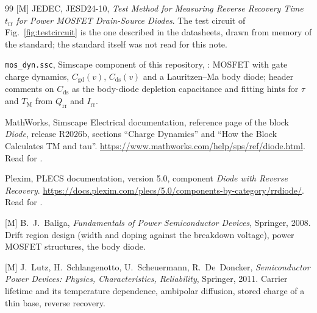\documentclass[10pt,a4paper]{scrartcl}
\begin{document}
\begin{thebibliography}{99}
[M] JEDEC, JESD24-10, \emph{Test Method for Measuring Reverse Recovery Time $t_\mathrm{rr}$ for Power MOSFET Drain-Source Diodes}. The test circuit of Fig.~\ref{fig:testcircuit} is the one described in the datasheets, drawn from memory of the standard; the standard itself was not read for this note.

\texttt{mos\_dyn.ssc}, Simscape component of this repository, : MOSFET with gate charge dynamics, $C_\mathrm{gd}(v)$, $C_\mathrm{ds}(v)$ and a Lauritzen--Ma body diode; header comments on $C_\mathrm{ds}$ as the body-diode depletion capacitance and fitting hints for $\tau$ and $T_\mathrm{M}$ from $Q_\mathrm{rr}$ and $I_\mathrm{rr}$.

MathWorks, Simscape Electrical documentation, reference page of the block \emph{Diode}, release R2026b, sections ``Charge Dynamics'' and ``How the Block Calculates TM and tau''. \url{https://www.mathworks.com/help/sps/ref/diode.html}. Read for \cite{lmnote}.

Plexim, PLECS documentation, version 5.0, component \emph{Diode with Reverse Recovery}. \url{https://docs.plexim.com/plecs/5.0/components-by-category/rrdiode/}. Read for \cite{lmnote}.

[M] B.~J.~Baliga, \emph{Fundamentals of Power Semiconductor Devices}, Springer, 2008. Drift region design (width and doping against the breakdown voltage), power MOSFET structures, the body diode.

[M] J.~Lutz, H.~Schlangenotto, U.~Scheuermann, R.~De~Doncker, \emph{Semiconductor Power Devices: Physics, Characteristics, Reliability}, Springer, 2011. Carrier lifetime and its temperature dependence, ambipolar diffusion, stored charge of a thin base, reverse recovery.

\end{thebibliography}
\end{document}
